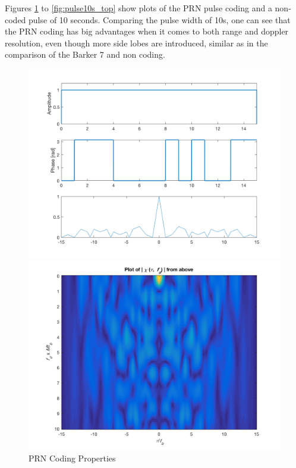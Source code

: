 Figures \ref{fig:PRN_props} to \ref{fig:pulse10s_top} show plots of the PRN pulse coding and a non-coded pulse of 10 seconds. Comparing the pulse width of 10s, one can see that the PRN coding has big advantages when it comes to both range and doppler resolution, even though more side lobes are introduced, similar as in the comparison of the Barker 7 and non coding.

\begin{figure}[!htbp]
  \centering
  \begin{minipage}[b]{0.45\textwidth}
    \includegraphics[width=\textwidth]{images/prn_props}
    \caption{PRN Coding Properties}
    \label{fig:PRN_props}
  \end{minipage}
  \hfill
      \begin{minipage}[b]{0.45\textwidth}
    \includegraphics[width=\textwidth]{images/prn_top}

\end{minipage}
\end{figure}
